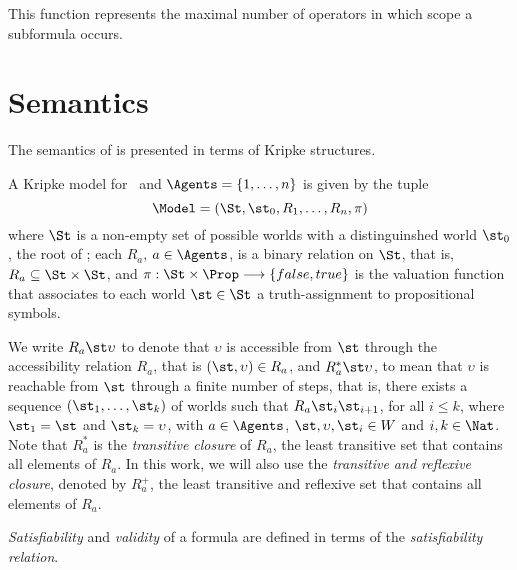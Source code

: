 This function represents the maximal number of operators in which scope a
subformula occurs.

\section{Semantics}
\label{semantics}

The semantics of  is presented in terms of Kripke structures.

\begin{definition}
\label{def:semantics}
    A Kripke model for \Prop~and $\Agents = \{1, \ldots, n\}$ is given by the tuple 
    \begin{equation}
        \Model = (\St, \st_0, R_1, \ldots, R_n, \pi)
    \end{equation}
    where $\St$ is a non-empty set of possible worlds with a distinguinshed world
    $\st_0$, the root of \Model; each $R_a$, $a \in \Agents$, is a binary relation
    on $\St$, that is, $R_a \subseteq \St \times \St$, and $\pi: \St \times \Prop
    \longrightarrow \{false, true\}$ is the valuation function that associates
    to each world $\st \in \St$ a truth-assignment to propositional symbols.
\end{definition}

We write $R_a \st \upsilon$ to denote that $\upsilon$ is accessible from $\st$ through
the accessibility relation $R_a$, that is $(\st, \upsilon) \in R_a$, and $R^*_a \st
\upsilon$, to mean that $\upsilon$ is reachable from $\st$ through a finite number of
steps, that is, there exists a sequence $(\st_1, \ldots, \st_k)$ of worlds such that
$R_a \st_i \st_{i+1}$, for all $i \leq k$, where $\st_1 = \st$ and $\st_k =
\upsilon$, with $a \in \Agents$, $\st, \upsilon, \st_i \in W$ and $i, k \in \Nat$. Note
that $R_a^*$ is the \emph{transitive closure} of $R_a$, the least transitive set
that contains all elements of $R_a$. In this work, we will also use the
\emph{transitive and reflexive closure}, denoted by $R_a^+$, the least
transitive and reflexive set that contains all elements of $R_a$.

\emph{Satisfiability} and \emph{validity} of a formula are defined in terms of the \emph{satisfiability relation}.

